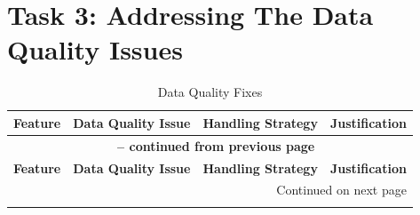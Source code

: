 \documentclass[11pt]{article}
\begin{document}
\section*{Task 3: Addressing The Data Quality Issues}
\begin{longtable}{|p{1.7cm}|p{4cm}|p{3cm}|p{6cm}|}
	\caption{Data Quality Fixes} \label{tab:feature_quality_fixes} \\
	\hline
	\textbf{Feature} & \textbf{Data Quality Issue} & \textbf{Handling Strategy} & \textbf{Justification} \\
	\hline
	\endfirsthead
	
	\multicolumn{4}{c}{{\bfseries \tablename\ \thetable{} -- continued from previous page}} \\
	\hline
	\textbf{Feature} & \textbf{Data Quality Issue} & \textbf{Handling Strategy} & \textbf{Justification} \\
	\hline
	\endhead
	
	\hline \multicolumn{4}{|r|}{{Continued on next page}} \\ \hline
	\endfoot
	

\end{longtable}
\end{document}
